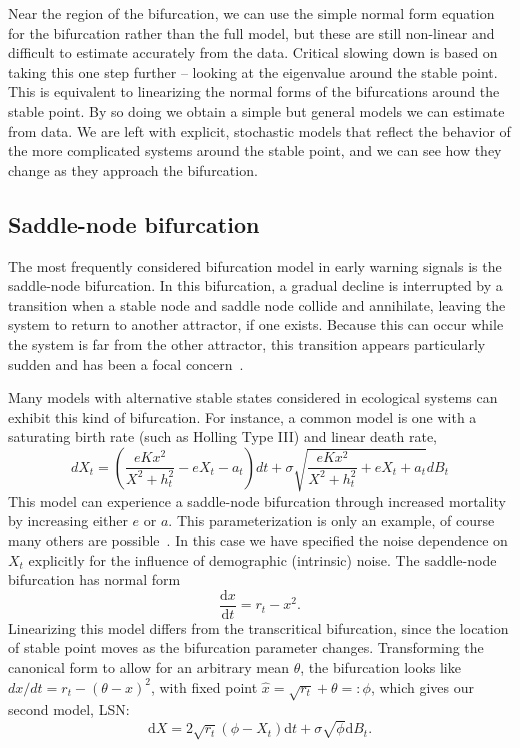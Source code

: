 \documentclass[authoryear, preprint,review,12pt]{elsarticle}
\newcommand{\ud}{\mathrm{d}}
\begin{document}
Near the region of the bifurcation,
we can use the simple normal form equation for the bifurcation rather than the full model,
but these are still non-linear and difficult to estimate accurately from the data.
Critical slowing down is based on taking this one step further -- looking at the eigenvalue around the stable point.
This is equivalent to linearizing the normal forms of the bifurcations around the stable point.
By so doing we obtain a simple but general models we can estimate from data.
We are left with explicit, stochastic models that reflect the behavior of the more complicated systems around the stable point, and we can see how they change as they approach the bifurcation.  


\subsection{Saddle-node bifurcation}
The most frequently considered bifurcation model in early warning signals is the saddle-node bifurcation.  
In this bifurcation, a gradual decline is interrupted by a transition when a stable node and saddle node collide and annihilate, 
leaving the system to return to another attractor, if one exists.  
Because this can occur while the system is far from the other attractor, 
this transition appears particularly sudden and has been a focal concern~\citep{Scheffer2001, Scheffer2009}.  

Many models with alternative stable states considered in ecological systems can exhibit this kind of bifurcation.  For instance, a common model is one with a saturating birth rate (such as Holling Type III) and linear death rate, 
\begin{equation}
dX_t = \left( \frac{e K x^2}{X^2 + h_t^2} - e X_t - a_t\right) dt + \sigma \sqrt{ \frac{e K x^2}{X^2 + h_t^2} + e X_t + a_t} dB_t \label{ass}
\end{equation}
This model can experience a saddle-node bifurcation through increased mortality by increasing either $e$ or $a$.  This parameterization is only an example, of course many others are possible~\citep{Scheffer2009a, Scheffer2001, Strogatz2001a, Guckenheimer1983}.  
In this case we have specified the noise dependence on $X_t$ explicitly for the influence of demographic (intrinsic) noise.
The saddle-node bifurcation has normal form
\begin{equation}
\frac{\ud x}{\ud t} = r_t- x^2.
\label{saddle-node}
\end{equation}
Linearizing this model differs from the transcritical bifurcation, since the location of stable point moves as the bifurcation parameter changes.
Transforming the canonical form to allow for an arbitrary mean $\theta$,  the bifurcation looks like $ dx/dt = r_t- (\theta-x)^2 $, with fixed point $\hat x = \sqrt{r_t} +\theta =: \phi$, which gives our second model, LSN: 
\begin{equation}
\ud X = 2\sqrt{ r_t } (\phi - X_t)\ud t + \sigma\sqrt{\phi } \ud B_t. \label{LSN}
\end{equation}
\end{document}
